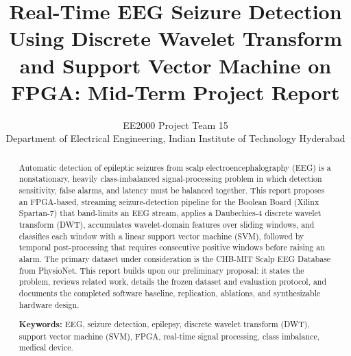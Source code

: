 \documentclass[10pt,twocolumn,letterpaper]{article}
\title{Real-Time EEG Seizure Detection Using Discrete Wavelet Transform\\
and Support Vector Machine on FPGA: Mid-Term Project Report}
\author{EE2000 Project Team 15\\[2pt]
Department of Electrical Engineering, Indian Institute of Technology Hyderabad}
\begin{document}
\maketitle

\begin{abstract}
Automatic detection of epileptic seizures from scalp
electroencephalography (EEG) is a nonstationary, heavily class-imbalanced
signal-processing problem in which detection sensitivity, false alarms,
and latency must be balanced together. This report proposes an
FPGA-based, streaming seizure-detection pipeline for the Boolean Board
(Xilinx Spartan-7) that band-limits an EEG stream, applies a
Daubechies-4 discrete wavelet transform (DWT), accumulates wavelet-domain
features over sliding windows, and classifies each window with a linear
support vector machine (SVM), followed by temporal post-processing that
requires consecutive positive windows before raising an alarm. The
primary dataset under consideration is the CHB-MIT Scalp EEG Database
from PhysioNet. This report builds upon our preliminary proposal: it states
the problem, reviews related work, details the frozen dataset and evaluation
protocol, and documents the completed software baseline, replication,
ablations, and synthesizable hardware design.

\medskip
\noindent\textbf{Keywords:} EEG, seizure detection, epilepsy, discrete
wavelet transform (DWT), support vector machine (SVM), FPGA, real-time
signal processing, class imbalance, medical device.


\end{abstract}
\end{document}
